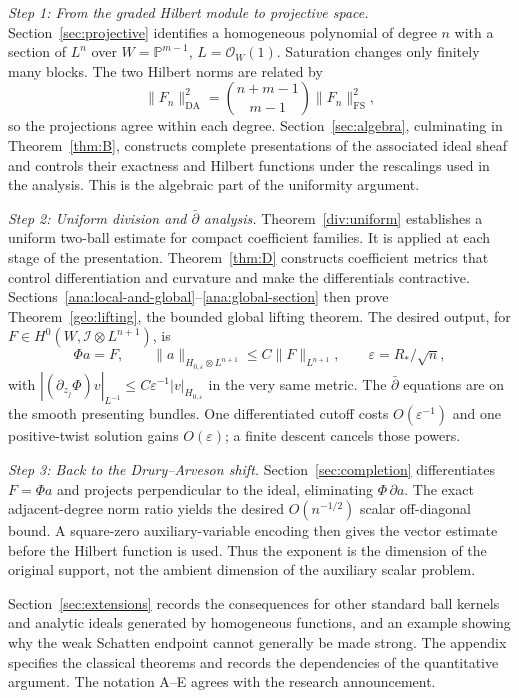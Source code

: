 \documentclass[11pt,reqno]{amsart}
\numberwithin{equation}{section}
\theoremstyle{definition}
\theoremstyle{remark}
\newcommand{\Pj}{\mathbb P}
\newcommand{\cO}{\mathcal O}
\newcommand{\FS}{\mathrm{FS}}
\newcommand{\DA}{\mathrm{DA}}
\begin{document}
\medskip\noindent\emph{Step 1: From the graded Hilbert module to projective space.}
Section~\ref{sec:projective} identifies a homogeneous polynomial of degree
$n$ with a section of $L^n$ over $W=\Pj^{m-1}$, $L=\cO_W(1)$. Saturation
changes only finitely many blocks. The two Hilbert norms are related by
\[
 \|F_n\|_{\DA}^2=\binom{n+m-1}{m-1}\|F_n\|_{\FS}^2,
\]
so the projections agree within each degree. Section~\ref{sec:algebra},
culminating in Theorem~\ref{thm:B}, constructs complete presentations of the
associated ideal sheaf and controls their exactness and Hilbert functions
under the rescalings used in the analysis. This is the algebraic part of
the uniformity argument.

\medskip\noindent\emph{Step 2: Uniform division and $\bar\partial$ analysis.}
Theorem~\ref{div:uniform} establishes a uniform two-ball estimate for
compact coefficient families. It is applied at each stage of the
presentation. Theorem~\ref{thm:D} constructs coefficient metrics that
control differentiation and curvature and make the differentials
contractive. Sections~\ref{ana:local-and-global}--\ref{ana:global-section}
then prove Theorem~\ref{geo:lifting}, the bounded global lifting theorem.
The desired output, for $F\in H^0(W,\mathscr I\otimes L^{n+1})$, is
\[
 \Phi a=F,\qquad
 \|a\|_{H_{0,\varepsilon}\otimes L^{n+1}}\le C\|F\|_{L^{n+1}},
 \qquad\varepsilon=R_*/\sqrt n,
\]
with $|(\partial_{z_j}\Phi)v|_{L^{-1}}\le
C\varepsilon^{-1}|v|_{H_{0,\varepsilon}}$ in the very same metric.
The $\bar\partial$ equations are on the smooth presenting bundles.
One differentiated cutoff costs $O(\varepsilon^{-1})$ and one positive-twist
solution gains $O(\varepsilon)$; a finite descent cancels those powers.

\medskip\noindent\emph{Step 3: Back to the Drury--Arveson shift.}
Section~\ref{sec:completion} differentiates $F=\Phi a$ and projects
perpendicular to the ideal, eliminating $\Phi\,\partial a$.
The exact adjacent-degree norm ratio yields the desired $O(n^{-1/2})$
scalar off-diagonal bound. A square-zero auxiliary-variable encoding
then gives the vector estimate before the Hilbert function is used.
Thus the exponent is the dimension of the original support, not the
ambient dimension of the auxiliary scalar problem.

Section~\ref{sec:extensions} records the consequences for other standard
ball kernels and analytic ideals generated by homogeneous functions, and
an example showing why the weak Schatten endpoint cannot generally be
made strong. The appendix specifies the classical theorems and records
the dependencies of the quantitative argument. The notation A--E agrees
with the research announcement.
\end{document}
